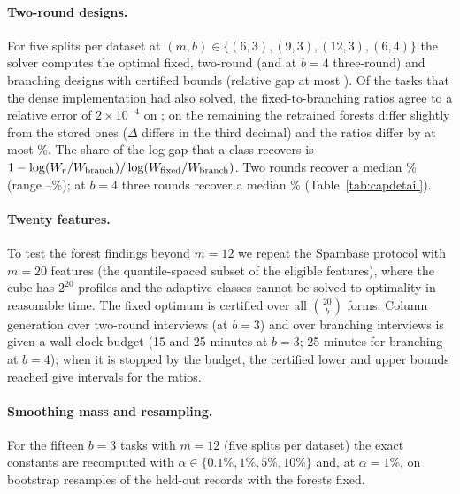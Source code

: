 


\paragraph{Two-round designs.}
For five splits per dataset at $(m,b)\in\{(6,3),(9,3),(12,3),(6,4)\}$ the solver computes the optimal fixed, two-round (and at $b=4$ three-round) and branching designs with certified bounds (relative gap at most \nForestGapMax). Of the \nForestOverlapN{} tasks that the dense implementation had also solved, the fixed-to-branching ratios agree to a relative error of $2\times10^{-4}$ on \nForestOverlapAgree; on the remaining \nForestOverlapRest{} the retrained forests differ slightly from the stored ones ($\Delta$ differs in the third decimal) and the ratios differ by at most \nForestOverlapMax\%. The share of the log-gap that a class recovers is $1-\log(W_r/W_{\rm branch})/\log(W_{\rm fixed}/W_{\rm branch})$. Two rounds recover a median \nTwoForestMed\% (range \nTwoForestLo--\nTwoForestHi\%); at $b=4$ three rounds recover a median \nThreeForestMed\% (Table~\ref{tab:capdetail}).

\paragraph{Twenty features.}
To test the forest findings beyond $m=12$ we repeat the Spambase protocol with $m=20$ features (the quantile-spaced subset of the eligible features), where the cube has $2^{20}$ profiles and the adaptive classes cannot be solved to optimality in reasonable time. The fixed optimum is certified over all $\binom{20}b$ forms. Column generation over two-round interviews (at $b=3$) and over branching interviews is given a wall-clock budget (15 and 25 minutes at $b=3$; 25 minutes for branching at $b=4$); when it is stopped by the budget, the certified lower and upper bounds reached give intervals for the ratios.

\nForestScaleAppendixText

\paragraph{Smoothing mass and resampling.}
For the fifteen $b=3$ tasks with $m=12$ (five splits per dataset) the exact constants are recomputed with $\alpha\in\{0.1\%,1\%,5\%,10\%\}$ and, at $\alpha=1\%$, on bootstrap resamples of the held-out records with the forests fixed.


